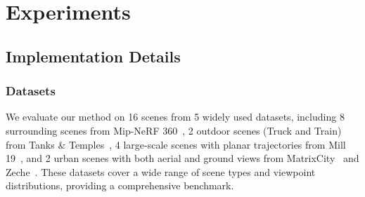 \documentclass[lettersize,journal]{IEEEtran}
\begin{document}
\section{Experiments\label{sec:experiments}}
 
\subsection{Implementation Details}


\subsubsection{Datasets}

We evaluate our method on 16 scenes from 5 widely used datasets, including
8 surrounding scenes 
from Mip-NeRF 360~\cite{mipnerf360},
2 outdoor scenes (Truck and Train) from Tanks \& Temples~\cite{tankstemples},
4 large-scale scenes with planar trajectories from Mill 19~\cite{meganerf},
and 2 urban scenes with both aerial and ground views from MatrixCity~\cite{matrixcity} and Zeche~\cite{isprs}.
These datasets cover a wide range of scene types and viewpoint distributions, providing a comprehensive benchmark.
\end{document}
